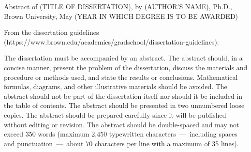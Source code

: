 \documentclass[12pt]{article}
\begin{document}
Abstract of (TITLE OF DISSERTATION), by (AUTHOR'S NAME), Ph.D., Brown University, May (YEAR IN WHICH DEGREE IS TO BE AWARDED)

\vspace{2cm}
\doublespacing
From the dissertation guidelines (https://www.brown.edu/academics/gradschool/dissertation-guidelines):

The dissertation must be accompanied by an abstract. The abstract should, in a concise manner, present the problem of the dissertation, discuss the materials and procedure or methods used, and state the results or conclusions. Mathematical formulas, diagrams, and other illustrative materials should be avoided. The abstract should not be part of the dissertation itself nor should it be included in the table of contents. The abstract should be presented in two unnumbered loose copies. The abstract should be prepared carefully since it will be published without editing or revision. The abstract should be double-spaced and may not exceed 350 words (maximum 2,450 typewritten characters — including spaces and punctuation — about 70 characters per line with a maximum of 35 lines). 
\end{document}
